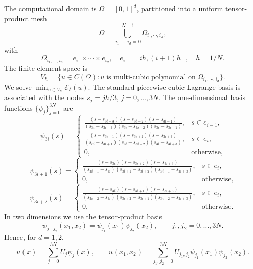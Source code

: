 \documentclass{article}
\theoremstyle{definition}
\begin{document}
The computational domain is $\Omega=[0,1]^d$, partitioned into a uniform tensor-product mesh
$$\Omega=\bigcup_{i_1,\cdots,i_d=0}^{N-1} \Omega_{i_1,\cdots,i_d},$$
with
$$\Omega_{i_1,\cdots,i_d}=e_{i_1}\times \cdots \times e_{i_d},\quad e_i=[ih,(i+1)h],\quad h=1/N.$$ 
The finite element space is
\[V_h=\{u\in C(\Omega): u\; \mbox{is multi-cubic polynomial on} \;\Omega_{i_1,\cdots,i_d}\}.\]
We solve $\min_{u\in V_h}\mathcal{E}_\delta(u)$. The standard piecewise cubic Lagrange basis is associated with the nodes $s_j=jh/3$, $j=0,\ldots,3N$. The one-dimensional basis functions $\{\psi_j\}_{j=0}^{3N}$ are
\[
\psi_{3i}(s)=
\begin{cases}
\displaystyle
\frac{(s-s_{3i-3})(s-s_{3i-2})(s-s_{3i-1})}
{(s_{3i}-s_{3i-3})(s_{3i}-s_{3i-2})(s_{3i}-s_{3i-1})},
& s\in e_{i-1},\\[2mm]
\displaystyle
\frac{(s-s_{3i+1})(s-s_{3i+2})(s-s_{3i+3})}
{(s_{3i}-s_{3i+1})(s_{3i}-s_{3i+2})(s_{3i}-s_{3i+3})},
& s\in e_i,\\[2mm]
0, & \mbox{otherwise},
\end{cases}
\]
\[
\psi_{3i+1}(s)=
\begin{cases}
\displaystyle
\frac{(s-s_{3i})(s-s_{3i+2})(s-s_{3i+3})}
{(s_{3i+1}-s_{3i})(s_{3i+1}-s_{3i+2})(s_{3i+1}-s_{3i+3})},
& s\in e_i,\\[2mm]
0, & \mbox{otherwise},
\end{cases}
\]
\[
\psi_{3i+2}(s)=
\begin{cases}
\displaystyle
\frac{(s-s_{3i})(s-s_{3i+1})(s-s_{3i+3})}
{(s_{3i+2}-s_{3i})(s_{3i+2}-s_{3i+1})(s_{3i+2}-s_{3i+3})},
& s\in e_i,\\[2mm]
0, & \mbox{otherwise}.
\end{cases}
\]
In two dimensions we use the tensor-product basis
\[
  \psi_{j_1,j_2}(x_1,x_2)=\psi_{j_1}(x_1)\psi_{j_2}(x_2),
  \qquad j_1,j_2=0,\ldots,3N.
\]
Hence, for $d=1,2$,
\[
  u(x)=\sum_{j=0}^{3N}U_j\psi_j(x),
  \qquad
  u(x_1,x_2)=\sum_{j_1,j_2=0}^{3N}
  U_{j_1,j_2}\psi_{j_1}(x_1)\psi_{j_2}(x_2).
\]
\end{document}
